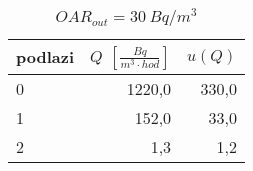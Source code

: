 \begin{table}[ht]
    \centering
    \caption{$OAR_{out}=\SI{30}{Bq/m^3}$}
\begin{tabular}{lrr}
\toprule
podlazi &  $Q$ $\left[\si{\frac{Bq}{m^3\cdot hod}}\right]$ & $u(Q)$ \\
\midrule
0 &                       1220,0 &  330,0 \\
1 &                        152,0 &   33,0 \\
2 &                          1,3 &    1,2 \\
\bottomrule
\end{tabular}
\end{table}
